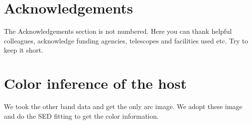 \documentclass[fleqn,usenatbib]{mnras}
\begin{document}
\section*{Acknowledgements}

The Acknowledgements section is not numbered. Here you can thank helpful
colleagues, acknowledge funding agencies, telescopes and facilities used etc.
Try to keep it short.










\appendix

\section{Color inference of the host}
We took the other band data and get the only arc image. We adopt these image and do the SED fitting to get the color information.



\bsp	%
\label{lastpage}
\end{document}
